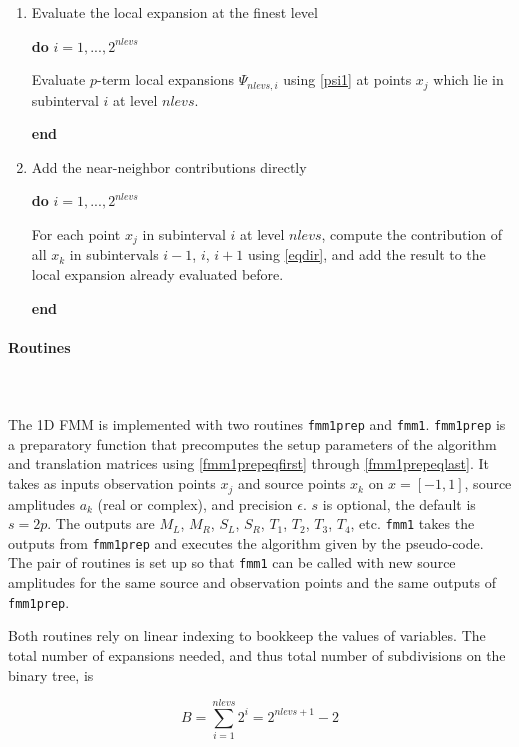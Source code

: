 \begin{enumerate}
\item Evaluate the local expansion at the finest level

\textbf{do} $i = 1, ..., 2^{nlevs}$
\begin{addmargin}[1em]{2em}
Evaluate $p$-term local expansions $\Psi_{nlevs,i}$ using \eqref{psi1} at points $x_j$ which lie in subinterval $i$ at level $nlevs$. 
\end{addmargin}
\textbf{end}

\item Add the near-neighbor contributions directly

\textbf{do} $i = 1, ..., 2^{nlevs}$
\begin{addmargin}[1em]{2em}
For each point $x_j$ in subinterval $i$ at level $nlevs$, compute the contribution of all $x_k$ in subintervals $i-1$, $i$, $i+1$ using \eqref{eqdir}, and add the result to the local expansion already evaluated before. 
\end{addmargin}
\textbf{end}


\end{enumerate}

\paragraph{Routines} 
\mbox{}\\
\mbox{}\\
The 1D FMM is implemented with two routines \texttt{fmm1prep} and  \texttt{fmm1}.  \texttt{fmm1prep} is a preparatory function that precomputes the setup parameters of the algorithm and translation matrices using \eqref{fmm1prepeqfirst} through \eqref{fmm1prepeqlast}.  It takes as inputs observation points $x_j$ and source points $x_k$ on $x = [-1, 1]$, source amplitudes $a_k$ (real or complex), and precision $\epsilon$.  $s$ is optional, the default is $s = 2p$. The outputs are $M_L$, $M_R$, $S_L$, $S_R$, $T_1$, $T_2$, $T_3$, $T_4$, etc.  \texttt{fmm1} takes the outputs from \texttt{fmm1prep} and executes the algorithm given by the pseudo-code. The pair of routines is set up so that \texttt{fmm1} can be called with new source amplitudes for the same source and observation points and the same outputs of \texttt{fmm1prep}.  

Both routines rely on linear indexing to bookkeep the values of variables. The total number of expansions needed, and thus total number of subdivisions on the binary tree, is

\begin{equation}
B = \sum_{i=1}^{nlevs} 2^i = 2^{nlevs + 1} - 2
\end{equation}

